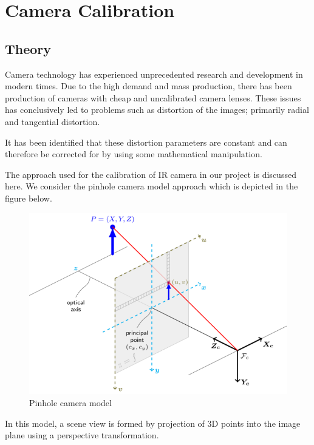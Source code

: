 \documentclass[12pt, a4paper, font = Times New Roman]{article}
\begin{document}
\tableofcontents
\newpage
\listoffigures
\newpage

\section{Camera Calibration}

\subsection{Theory}
\par
Camera technology has experienced unprecedented research and development in modern times. Due to the high demand and mass production, there has been production of cameras with cheap and uncalibrated camera lenses. These issues has conclusively led to problems such as distortion of the images; primarily radial and tangential distortion.
\par
It has been identified that these distortion parameters are constant and can therefore be corrected for by using some mathematical manipulation.  
\par
The approach used for the calibration of IR camera in our project is discussed here. We consider the pinhole camera model approach which is depicted in the figure below.

\begin{figure}[h!]
\includegraphics[scale=0.5]{pinhole_camera_model.png}
\caption{Pinhole camera model}
\label{fig:pinhole camera}
\end{figure}

\vspace{2cm}
\par
In this model, a scene view is formed by projection of 3D points into the image plane using a perspective transformation.
\end{document}
